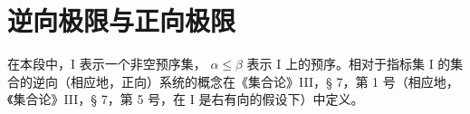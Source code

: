 \section{逆向极限与正向极限}

在本段中，I 表示一个非空预序集， \(\alpha \leqslant \beta\) 表示 I 上的预序。相对于指标集 I 的集合的逆向（相应地，正向）系统的概念在《集合论》III，§ 7，第 1 号（相应地，《集合论》III，§ 7，第 5 号，在 I 是右有向的假设下）中定义。

